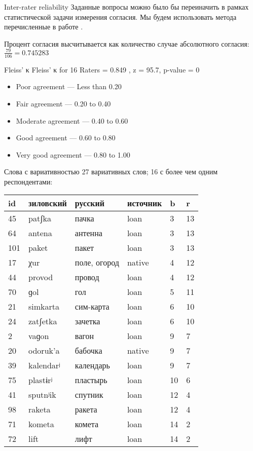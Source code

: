 \documentclass[13pt, t]{beamer}
\begin{document}
\begin{frame}{Inter-rater reliability}
Заданные вопросы можно было бы переиначить в рамках статистической задачи измерения согласия. Мы будем использовать метода перечисленные в работе \citep{hallgren12}.

\begin{block}{Процент согласия}
высчитывается как количество случае абсолютного согласия:
$\frac{79}{106} = 0.745283$
\end{block}
\begin{block}{Fleiss' κ}
Fleiss' κ for 16 Raters = 0.849 , z = 95.7, p-value = 0
\begin{itemize}
\item    Poor agreement — Less than 0.20
\item    Fair agreement — 0.20 to 0.40
\item    Moderate agreement — 0.40 to 0.60
\item    Good agreement — 0.60 to 0.80
\item    Very good agreement — 0.80 to 1.00
\end{itemize}
\end{block}
\end{frame}

\begin{frame}{Слова с вариативностью}
27 вариативных слов; 16 с более чем одним респондентами: \bigskip\\

\small
\begin{tabular}{|l|l|l|l|l|l|}
\hline
id & зиловский & русский & источник & b & r \\ \hline
45 & patʃka & пачка & loan & 3 & 13 \\ \hline
64 & antena & антенна & loan & 3 & 13 \\ \hline
101 & paket & пакет & loan & 3 & 13 \\ \hline
17 & χur & поле, огород & native & 4 & 12 \\ \hline
44 & provod & провод & loan & 4 & 12 \\ \hline
70 & ɡol & гол & loan & 5 & 11 \\ \hline
21 & simkarta & сим-карта & loan & 6 & 10 \\ \hline
24 & zatʃetka & зачетка & loan & 6 & 10 \\ \hline
2 & vaɡon & вагон & loan & 9 & 7 \\ \hline
20 & odoruk'a & бабочка & native & 9 & 7 \\ \hline
39 & kalendarʲ & календарь & loan & 9 & 7 \\ \hline
75 & plastɨrʲ & пластырь & loan & 10 & 6 \\ \hline
41 & sputnʲik & спутник & loan & 12 & 4 \\ \hline
98 & raketa & ракета & loan & 12 & 4 \\ \hline
71 & kometa & комета & loan & 14 & 2 \\ \hline
72 & lift & лифт & loan & 14 & 2 \\ \hline
\end{tabular}
\end{frame}
\end{document}
